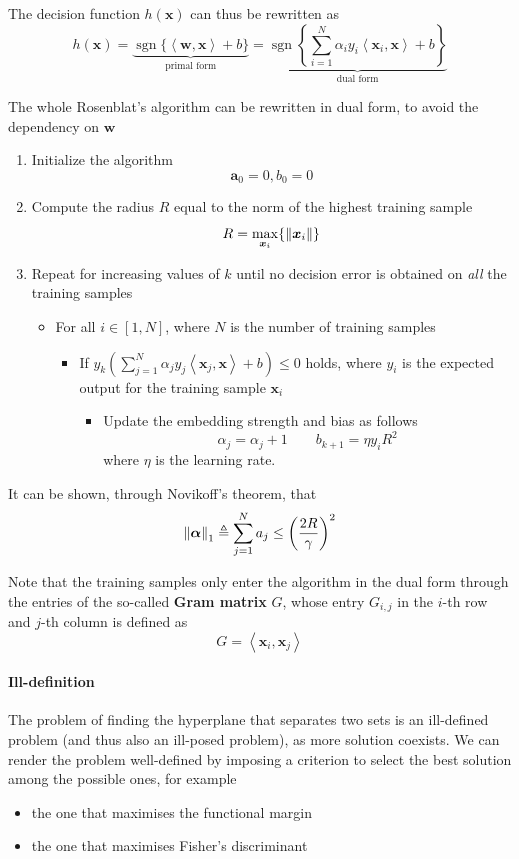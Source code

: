 \documentclass[oneside,onecolumn]{report}
\newcommand{\inp}[2]{\left\langle #1, #2 \right\rangle}
\DeclareMathOperator*{\sgn}{sgn}
\begin{document}
The decision function $h(\bm x)$ can thus be rewritten as
$$
h(\bm x)
= \underbrace{\sgn\{ \inp{\bm w}{\bm x} + b \}}_\text{primal form}
= \underbrace{\sgn \left\{ \sum_{i = 1}^N \alpha_i y_i \inp{\bm x_i}{\bm x} + b \right\}}_\text{dual form}
$$

The whole Rosenblat's algorithm can be rewritten in dual form, to avoid the dependency on $\bm w$
\begin{enumerate}
    \item Initialize the algorithm
    $$ \bm a_0 = 0, b_0 = 0 $$

    \item Compute the radius $R$ equal to the norm of the highest training sample
    $$ R = \max_{\bm x_i}\{\norm{\bm x_i}\} $$

    \item Repeat for increasing values of $k$ until no decision error is obtained on \emph{all} the training samples
    \begin{itemize}
        \item For all $i \in [1, N]$, where $N$ is the number of training samples
        \begin{itemize}[label=\textbullet]
            \item If $y_k \left( \sum_{j = 1}^N \alpha_j y_j \inp{\bm x_j}{\bm x} + b \right) \leq 0$ holds, where $y_i$ is the expected output for the training sample $\bm x_i$
            \begin{itemize}[label=\textbullet]
                \item Update the embedding strength and bias as follows
                $$ \alpha_j = \alpha_j + 1 \qquad b_{k + 1} = \eta y_i R^2 $$
                where $\eta$ is the learning rate.
            \end{itemize}
        \end{itemize}
    \end{itemize}
\end{enumerate}

It can be shown, through Novikoff's theorem, that
$$ \norm{\bm \alpha}_1 \triangleq \sum_{j = 1}^N a_j \leq \left( \frac{2 R}{\gamma} \right)^2 $$

Note that the training samples only enter the algorithm in the dual form through the entries of the so-called \textbf{Gram matrix} $G$, whose entry $G_{i, j}$ in the $i$-th row and $j$-th column is defined as
$$ G = \inp{\bm x_i}{\bm x_j} $$

\paragraph{Ill-definition}
The problem of finding the hyperplane that separates two sets is an ill-defined problem (and thus also an ill-posed problem), as more solution coexists.
We can render the problem well-defined by imposing a criterion to select the best solution among the possible ones, for example
\begin{itemize}
    \item the one that maximises the functional margin
    \item the one that maximises Fisher's discriminant
\end{itemize}
\end{document}
